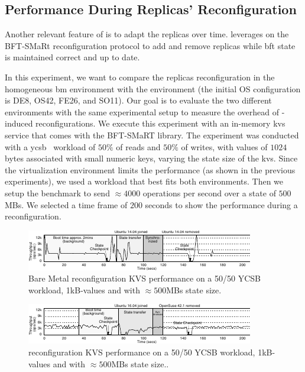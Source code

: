 \subsection{Performance During Replicas' Reconfiguration}
\label{sec:reconfiguration}
Another relevant feature of \system is to adapt the replicas over time. 
\system leverages on the BFT-SMaRt reconfiguration protocol to add and remove replicas while \gls{bft} state is maintained correct and up to date.

In this experiment, we want to compare the replicas reconfiguration in the homogeneous \gls{bm} environment with the \system environment (the initial OS configuration is DE8, OS42, FE26, and SO11).
Our goal is to evaluate the two different environments with the same experimental setup to measure the overhead of \system-induced reconfigurations. 
We execute this experiment with an in-memory \gls{kvs} service that comes with the BFT-SMaRT library.
The experiment was conducted with a \gls{ycsb}~\cite{Cooper:2010} workload of $50\%$ of reads and $50\%$ of writes, with values of $1024$ bytes associated with small numeric keys, varying the state size of the \gls{kvs}.
Since the virtualization environment limits the performance (as shown in the previous experiments), we used a workload that best fits both environments.
Then we setup the benchmark to send $\approx 4000$ operations per second over a state of $500$MBs. 
We selected a time frame of $200$ seconds to show the performance during a reconfiguration.


\begin{figure}[h]
\begin{center}
\includegraphics[width=\textwidth]{images/gnuplot/vagrant/reconfiguration/reconfiguration_bm.pdf}
\caption{Bare Metal reconfiguration KVS performance on a 50/50 YCSB workload, 1kB-values and with $\approx 500$MBs state size.}
\label{fig:reconfiguration_bm}
\end{center}
\end{figure}

\begin{figure}[h]
\begin{center}
\includegraphics[width=\textwidth]{images/gnuplot/vagrant/reconfiguration/reconfiguration_vm.pdf}
\caption{\system reconfiguration KVS performance on a 50/50 YCSB workload, 1kB-values and with $\approx 500$MBs state size..}
\label{fig:reconfiguration_vm}
\end{center}
\end{figure}

